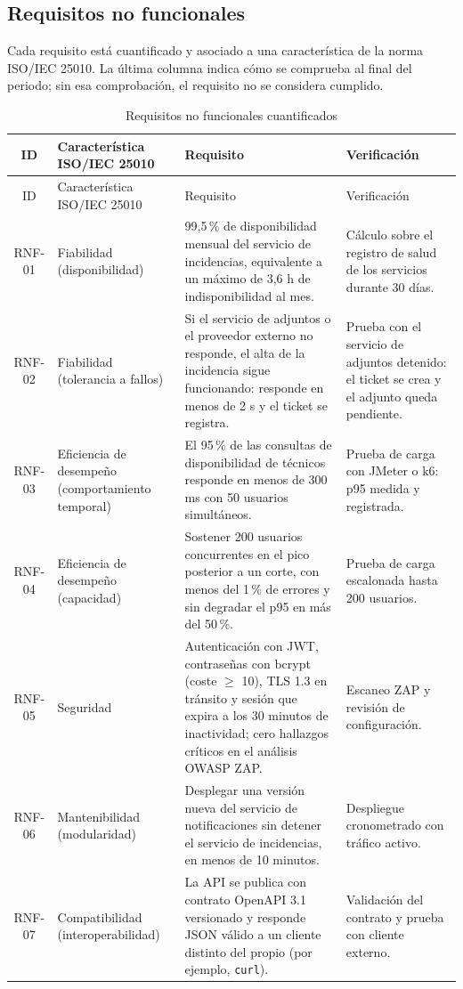 \subsection{Requisitos no funcionales}

Cada requisito está cuantificado y asociado a una característica de la norma ISO/IEC 25010.
La última columna indica cómo se comprueba al final del periodo; sin esa comprobación, el
requisito no se considera cumplido.

\begin{longtable}{@{}c p{3.9cm} p{6.2cm} p{3.0cm}@{}}
\caption{Requisitos no funcionales cuantificados}
\label{tab:rnf}\\
\toprule
ID & Característica ISO/IEC 25010 & Requisito & Verificación \\
\midrule
\endfirsthead
\toprule
ID & Característica ISO/IEC 25010 & Requisito & Verificación \\
\midrule
\endhead
\bottomrule
\endfoot
RNF-01 & Fiabilidad (disponibilidad) & 99,5\,\% de disponibilidad mensual del servicio de
incidencias, equivalente a un máximo de 3,6 h de indisponibilidad al mes.
& Cálculo sobre el registro de salud de los servicios durante 30 días. \\
\addlinespace
RNF-02 & Fiabilidad (tolerancia a fallos) & Si el servicio de adjuntos o el proveedor externo no
responde, el alta de la incidencia sigue funcionando: responde en menos de 2 s y el ticket se
registra.
& Prueba con el servicio de adjuntos detenido: el ticket se crea y el adjunto queda pendiente. \\
\addlinespace
RNF-03 & Eficiencia de desempeño (comportamiento temporal) & El 95\,\% de las consultas de
disponibilidad de técnicos responde en menos de 300 ms con 50 usuarios simultáneos.
& Prueba de carga con JMeter o k6: p95 medida y registrada. \\
\addlinespace
RNF-04 & Eficiencia de desempeño (capacidad) & Sostener 200 usuarios concurrentes en el pico
posterior a un corte, con menos del 1\,\% de errores y sin degradar el p95 en más del 50\,\%.
& Prueba de carga escalonada hasta 200 usuarios. \\
\addlinespace
RNF-05 & Seguridad & Autenticación con JWT, contraseñas con bcrypt (coste $\geq$ 10), TLS 1.3 en
tránsito y sesión que expira a los 30 minutos de inactividad; cero hallazgos críticos en el
análisis OWASP ZAP. & Escaneo ZAP y revisión de configuración. \\
\addlinespace
RNF-06 & Mantenibilidad (modularidad) & Desplegar una versión nueva del servicio de notificaciones
sin detener el servicio de incidencias, en menos de 10 minutos.
& Despliegue cronometrado con tráfico activo. \\
\addlinespace
RNF-07 & Compatibilidad (interoperabilidad) & La API se publica con contrato OpenAPI 3.1 versionado
y responde JSON válido a un cliente distinto del propio (por ejemplo, \texttt{curl}).
& Validación del contrato y prueba con cliente externo. \\
\end{longtable}
